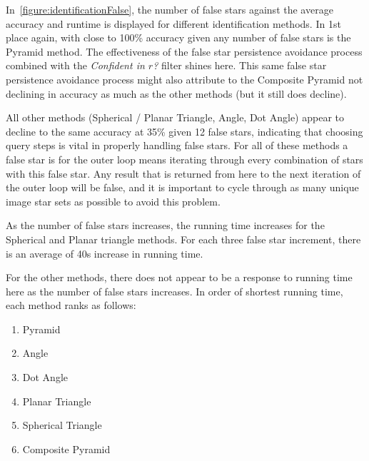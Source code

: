 
In~\autoref{figure:identificationFalse}, the number of false stars against the average accuracy and runtime is
displayed for different identification methods.
In 1st place again, with close to 100\% accuracy given any number of false stars is the Pyramid method.
The effectiveness of the false star persistence avoidance process combined with the \textit{Confident in $r$?} filter
shines here.
This same false star persistence avoidance process might also attribute to the Composite Pyramid not declining in
accuracy as much as the other methods (but it still does decline).

All other methods (Spherical / Planar Triangle, Angle, Dot Angle) appear to decline to the same accuracy at 35\%
given 12 false stars, indicating that choosing query steps is vital in properly handling false stars.
For all of these methods a false star is for the outer loop means iterating through every combination of stars with
this false star.
Any result that is returned from here to the next iteration of the outer loop will be false, and it is important to
cycle through as many unique image star sets as possible to avoid this problem.

As the number of false stars increases, the running time increases for the Spherical and Planar triangle methods.
For each three false star increment, there is an average of 40s increase in running time.

For the other methods, there does not appear to be a response to running time here as the number of false stars
increases.
In order of shortest running time, each method ranks as follows:
\begin{multicols}{2}
    \begin{enumerate}
        \item Pyramid
        \item Angle
        \item Dot Angle
        \item Planar Triangle
        \item Spherical Triangle
        \item Composite Pyramid
    \end{enumerate}
\end{multicols}

